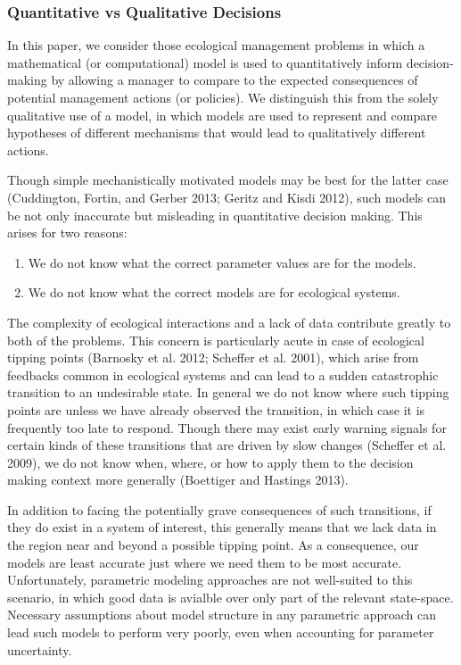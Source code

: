 \documentclass[author-year, review]{elsarticle} %
\begin{document}
\subsubsection{Quantitative vs Qualitative Decisions}

In this paper, we consider those ecological management problems in which
a mathematical (or computational) model is used to quantitatively inform
decision-making by allowing a manager to compare to the expected
consequences of potential management actions (or policies). We
distinguish this from the solely qualitative use of a model, in which
models are used to represent and compare hypotheses of different
mechanisms that would lead to qualitatively different actions.

Though simple mechanistically motivated models may be best for the
latter case (Cuddington, Fortin, and Gerber 2013; Geritz and Kisdi
2012), such models can be not only inaccurate but misleading in
quantitative decision making. This arises for two reasons:

\begin{enumerate}
\def\labelenumi{\arabic{enumi}.}
\itemsep1pt\parskip0pt
\item
  We do not know what the correct parameter values are for the models.
\item
  We do not know what the correct models are for ecological systems.
\end{enumerate}

The complexity of ecological interactions and a lack of data contribute
greatly to both of the problems. This concern is particularly acute in
case of ecological tipping points (Barnosky et al. 2012; Scheffer et al.
2001), which arise from feedbacks common in ecological systems and can
lead to a sudden catastrophic transition to an undesirable state. In
general we do not know where such tipping points are unless we have
already observed the transition, in which case it is frequently too late
to respond. Though there may exist early warning signals for certain
kinds of these transitions that are driven by slow changes (Scheffer et
al. 2009), we do not know when, where, or how to apply them to the
decision making context more generally (Boettiger and Hastings 2013).

In addition to facing the potentially grave consequences of such
transitions, if they do exist in a system of interest, this generally
means that we lack data in the region near and beyond a possible tipping
point. As a consequence, our models are least accurate just where we
need them to be most accurate.\\Unfortunately, parametric modeling
approaches are not well-suited to this scenario, in which good data is
avialble over only part of the relevant state-space. Necessary
assumptions about model structure in any parametric approach can lead
such models to perform very poorly, even when accounting for parameter
uncertainty.
\end{document}
